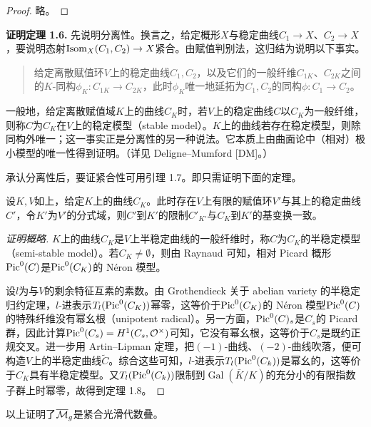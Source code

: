 \begin{proof}
略。
\end{proof}

\noindent\textbf{证明定理 1.6.}
先说明分离性。换言之，给定概形$X$与稳定曲线$C_1\to X$、$C_2\to X$，要说明态射$\operatorname{Isom}_X(C_1,C_2)\to X$紧合。由赋值判别法，这归结为说明以下事实。
\begin{quote}
给定离散赋值环$V$上的稳定曲线$C_1,C_2$，以及它们的一般纤维$C_{1K}$、$C_{2K}$之间的$K$-同构$\phi_K:C_{1K}\to C_{2K}$，此时$\phi_K$唯一地延拓为$C_1,C_2$的同构$\phi:C_1\to C_2$。
\end{quote}
一般地，给定离散赋值域$K$上的曲线$C_K$时，若$V$上的稳定曲线$C$以$C_K$为一般纤维，则称$C$为$C_K$在$V$上的稳定模型（stable model）。$K$上的曲线若存在稳定模型，则除同构外唯一；这一事实正是分离性的另一种说法。它本质上由曲面论中（相对）极小模型的唯一性得到证明。（详见 Deligne--Mumford [DM]。）

承认分离性后，要证紧合性可用引理 1.7。即只需证明下面的定理。

\begin{theorem}
设$K,V$如上，给定$K$上的曲线$C_K$。此时存在$V$上有限的赋值环$V'$与其上的稳定曲线$C'$，令$K'$为$V'$的分式域，则$C'$到$K'$的限制$C'_{K'}$与$C_K$到$K'$的基变换一致。
\end{theorem}

\begin{proof}[证明概略]
$K$上的曲线$C_K$是$V$上半稳定曲线的一般纤维时，称$C$为$C_K$的半稳定模型（semi-stable model）。若$C_K\ne\emptyset$，则由 Raynaud 可知，相对 Picard 概形$\operatorname{Pic}^0(C)$是$\operatorname{Pic}^0(C_K)$的 Néron 模型。

设$l$为与$V$的剩余特征互素的素数。由 Grothendieck 关于 abelian variety 的半稳定归约定理，$l$-进表示$T_l(\operatorname{Pic}^0(C_K))$幂零，这等价于$\operatorname{Pic}^0(C_K)$的 Néron 模型$\operatorname{Pic}^0(C)$的特殊纤维没有幂幺根（unipotent radical）。另一方面，$\operatorname{Pic}^0(C)_s$是$C_s$的 Picard 群，因此计算$\operatorname{Pic}^0(C_s)=H^1(C_s,\mathcal{O}^\times)$可知，它没有幂幺根，这等价于$C_s$是既约正规交叉。进一步用 Artin--Lipman 定理，把$(-1)$-曲线、$(-2)$-曲线吹落，便可构造$V$上的半稳定曲线$\tilde C$。综合这些可知，$l$-进表示$T_l(\operatorname{Pic}^0(C_k))$是幂幺的，这等价于$C_K$具有半稳定模型。又$T_l(\operatorname{Pic}^0(C_k))$限制到$\operatorname{Gal}(\bar K/K)$的充分小的有限指数子群上时幂零，故得到定理 1.8。
\end{proof}


以上证明了$\overline{\mathcal{M}}_{g}$是紧合光滑代数叠。

